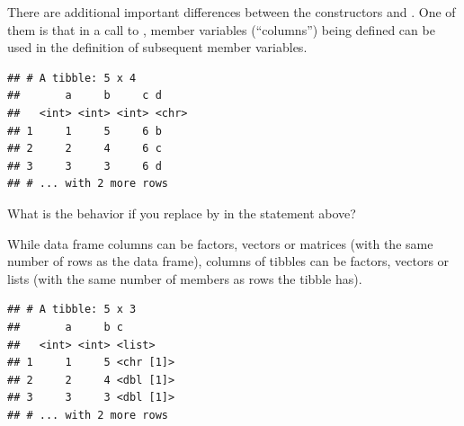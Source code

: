 \documentclass[krantz2]{krantz}\usepackage{knitr}
\begin{document}
There are additional important differences between the constructors  and . One of them is that in a call to , member variables (``columns'')  being defined can be used in the definition of subsequent member variables.

\begin{knitrout}\footnotesize
{}\color{fgcolor}\begin{kframe}
\begin{alltt}
\hlstd{(} \hlstd{=} \hlopt{:}\hlstd{,}  \hlstd{=} \hlopt{:}\hlstd{,}   \hlopt{+}   \hlstd{= letters[a} \hlopt{+} \hlstd{])}
\end{alltt}
\begin{verbatim}
## # A tibble: 5 x 4
##       a     b     c d
##   <int> <int> <int> <chr>
## 1     1     5     6 b
## 2     2     4     6 c
## 3     3     3     6 d
## # ... with 2 more rows
\end{verbatim}
\end{kframe}
\end{knitrout}

\begin{playground}
What is the behavior if you replace  by  in the statement above?
\end{playground}

While data frame columns can be factors, vectors or matrices (with the same number of rows as the data frame), columns of tibbles can be factors, vectors or lists (with the same number of members as rows the tibble has).

\begin{knitrout}\footnotesize
{}\color{fgcolor}\begin{kframe}
\begin{alltt}
\hlstd{(} \hlstd{=} \hlopt{:}\hlstd{,}  \hlstd{=} \hlopt{:}\hlstd{,}  \hlstd{=} \hlstd{(}\hlstd{,} \hlstd{,} \hlstd{,} \hlstd{,} \hlstd{))}
\end{alltt}
\begin{verbatim}
## # A tibble: 5 x 3
##       a     b c
##   <int> <int> <list>
## 1     1     5 <chr [1]>
## 2     2     4 <dbl [1]>
## 3     3     3 <dbl [1]>
## # ... with 2 more rows
\end{verbatim}
\end{kframe}
\end{knitrout}
\end{document}
